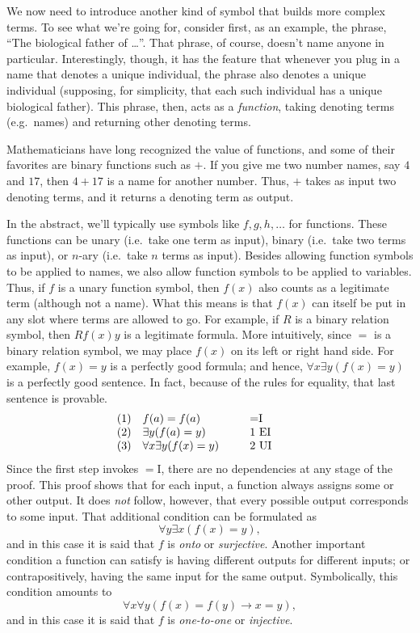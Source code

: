 We now need to introduce another kind of symbol that builds more
complex terms.  To see what we're going for, consider first, as an
example, the phrase, ``The biological father of \dots ''.  That
phrase, of course, doesn't name anyone in particular.  Interestingly,
though, it has the feature that whenever you plug in a name that
denotes a unique individual, the phrase also denotes a unique
individual (supposing, for simplicity, that each such individual has a
unique biological father).  This phrase, then, acts as a
\emph{function}, taking denoting terms (e.g.\ names) and returning
other denoting terms.

Mathematicians have long recognized the value of functions, and some
of their favorites are binary functions such as $+$.  If you give me
two number names, say $4$ and $17$, then $4+17$ is a name for another
number.  Thus, $+$ takes as input two denoting terms, and it returns a
denoting term as output.

In the abstract, we'll typically use symbols like $f,g,h,\dots $ for
functions.  These functions can be unary (i.e.\ take one term as
input), binary (i.e.\ take two terms as input), or $n$-ary (i.e.\ take
$n$ terms as input).  Besides allowing function symbols to be applied
to names, we also allow function symbols to be applied to variables.
Thus, if $f$ is a unary function symbol, then $f(x)$ also counts as a
legitimate term (although not a name).  What this means is that $f(x)$
can itself be put in any slot where terms are allowed to go.  For
example, if $R$ is a binary relation symbol, then $Rf(x)y$ is a
legitimate formula.  More intuitively, since $=$ is a binary relation
symbol, we may place $f(x)$ on its left or right hand side.  For
example, $f(x)=y$ is a perfectly good formula; and hence,
$\forall x\exists y(f(x)=y)$ is a perfectly good sentence.  In fact,
because of the rules for equality, that last sentence is provable.
\[ \begin{array}{l l >{$}p{3cm}<{$} p{2cm}}
       & (1) & f(a)=f(a) & $=$I \\
       & (2) & \exists y(f(a)=y) & 1 EI \\
       & (3) & \forall x\exists y(f(x)=y) & 2 UI 
   \end{array} \]
 Since the first step invokes $=$I, there are no dependencies at any
 stage of the proof.  This proof shows that for each input, a function always assigns
 some or other output.  It does {\it not} follow, however, that every
 possible output corresponds to some input.  That additional condition
 can be formulated as
 \[ \forall y\exists x(f(x)=y) , \] and in this case it is said that
 $f$ is \emph{onto} or \emph{surjective}.  Another important condition
 a function can satisfy is having different outputs for different
 inputs; or contrapositively, having the same input for the same
 output.  Symbolically, this condition amounts to
 \[ \forall x\forall y(f(x)=f(y)\to x=y) , \]
 and in this case it is said that $f$ is \emph{one-to-one} or
 \emph{injective}.

